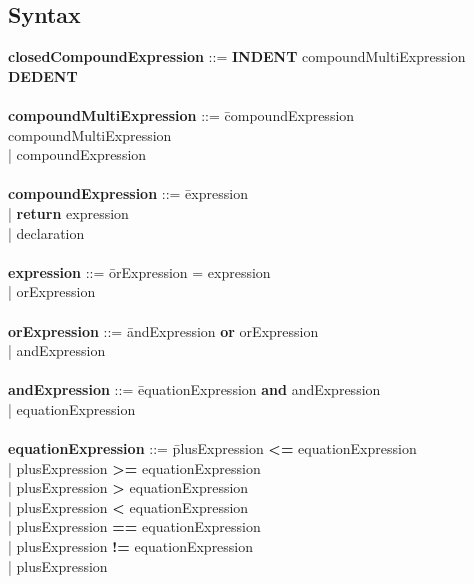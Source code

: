     \subsection{Syntax}
        \begin{tabbing} 
            {\bf closedCompoundExpression}    ::= \textbf{INDENT} compoundMultiExpression \textbf{DEDENT}\\
            \\ 
            {\bf compoundMultiExpression}     ::= \=compoundExpression compoundMultiExpression\\
                                                  \>| compoundExpression\\
            \\
            {\bf compoundExpression}          ::= \=expression\\
                                                  \>| \textbf{return} expression\\
                                                  \>| declaration\\
            \\ 
            {\bf expression}                  ::= \=orExpression = expression\\
                                                  \>| orExpression\\
            \\   
            {\bf orExpression}                ::= \=andExpression \textbf{or} orExpression\\
                                                  \>| andExpression\\
            \\   
            {\bf andExpression}               ::= \=equationExpression \textbf{and} andExpression\\
                                                  \>| equationExpression\\
            \\ 
            {\bf equationExpression}          ::= \=plusExpression \textbf{\textless{}=} equationExpression\\
                                                  \>| plusExpression \textbf{\textgreater{}=} equationExpression\\
                                                  \>| plusExpression \textbf{\textgreater{}} equationExpression\\
                                                  \>| plusExpression \textbf{\textless{}} equationExpression\\
                                                  \>| plusExpression \textbf{==} equationExpression\\
                                                  \>| plusExpression \textbf{!=} equationExpression\\
                                                  \>| plusExpression\\


\end{tabbing}
